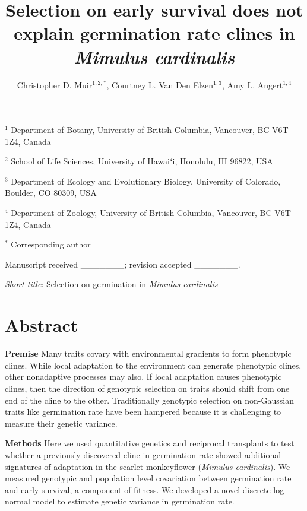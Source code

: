 \documentclass[
  12pt,
]{article}
\title{Selection on early survival does not explain germination rate clines in \emph{Mimulus cardinalis}}
\author{Christopher D. Muir\(^{1,2,*}\), Courtney L. Van Den Elzen\(^{1,3}\), Amy L. Angert\(^{1,4}\)}
\date{}
\makeatletter
\newcommand\iraggedright{%
  \let\\\@centercr\@rightskip\@flushglue \rightskip\@rightskip
  \leftskip\z@skip}
\makeatother
\begin{document}
\maketitle

\iraggedright

\newcommand{\pkg}[1]{{\fontseries{b}\selectfont #1}} 

\(^{1}\) Department of Botany, University of British Columbia, Vancouver, BC V6T 1Z4, Canada

\(^{2}\) School of Life Sciences, University of Hawaiʻi, Honolulu, HI 96822, USA

\(^{3}\) Department of Ecology and Evolutionary Biology, University of Colorado, Boulder, CO 80309, USA

\(^{4}\) Department of Zoology, University of British Columbia, Vancouver, BC V6T 1Z4, Canada

\(^{*}\) Corresponding author

Manuscript received \_\_\_\_\_\_\_; revision accepted \_\_\_\_\_\_\_.

\emph{Short title}: Selection on germination in \emph{Mimulus cardinalis}

\hypertarget{abstract}{%
\section{Abstract}\label{abstract}}

\textbf{Premise} Many traits covary with environmental gradients to form phenotypic clines. While local adaptation to the environment can generate phenotypic clines, other nonadaptive processes may also. If local adaptation causes phenotypic clines, then the direction of genotypic selection on traits should shift from one end of the cline to the other. Traditionally genotypic selection on non-Gaussian traits like germination rate have been hampered because it is challenging to measure their genetic variance.

\textbf{Methods} Here we used quantitative genetics and reciprocal transplants to test whether a previously discovered cline in germination rate showed additional signatures of adaptation in the scarlet monkeyflower (\emph{Mimulus cardinalis}). We measured genotypic and population level covariation between germination rate and early survival, a component of fitness. We developed a novel discrete log-normal model to estimate genetic variance in germination rate.
\end{document}
